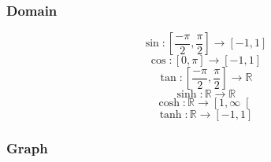 \documentclass[7pt,landscape, margin = 0.1mm]{article}
\begin{document}
\begin{multicols}{4}
\begin{flushleft}
\subsubsection{Domain}
$$\sin: \left[\frac{-\pi}{2},\frac{\pi}{2} \right] \longrightarrow \left[-1,1\right]$$
 $$\cos: \left[0,\pi \right] \longrightarrow \left[-1,1\right]$$
$$\tan: \left[\frac{-\pi}{2},\frac{\pi}{2}\right] \longrightarrow \mathbb{R}$$
$$\sinh: \mathbb{R} \longrightarrow\mathbb{R} $$
 $$\cosh: \mathbb{R}\longrightarrow \left[1,\infty\right[$$
 $$\tanh: \mathbb{R}\longrightarrow \left[-1,1\right]$$

\subsubsection{Graph}




\end{flushleft}
\end{multicols}
\end{document}

